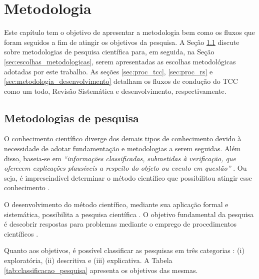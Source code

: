 \chapter[Metodologia]{Metodologia}\label{ch:metodologia}

Este capítulo tem o objetivo de apresentar a metodologia bem como os fluxos que foram seguidos a fim de atingir os objetivos da pesquisa. A Seção \ref{sec:metodologias} discute sobre metodologias de pesquisa científica para, em seguida, na Seção \ref{sec:escolhas_metodologicas}, serem apresentadas as escolhas metodológicas adotadas por este trabalho. As seções \ref{sec:proc_tcc}, \ref{sec:proc_rs} e \ref{sec:metodologia_desenvolvimento} detalham os fluxos de condução do TCC como um todo, Revisão Sistemática e desenvolvimento, respectivamente.

\section{Metodologias de pesquisa}\label{sec:metodologias}

O conhecimento científico diverge dos demais tipos de conhecimento devido à necessidade de adotar fundamentação e metodologias a serem seguidas. Além disso, baseia-se em \textit{“informações classificadas, submetidas à verificação, que oferecem explicações plausíveis a respeito do objeto ou evento em questão”} \cite[pág. 22]{prodanov2013}. Ou seja, é imprescindível determinar o método científico que possibilitou atingir esse conhecimento \cite[pág. 24]{prodanov2013}. 

O desenvolvimento do método científico, mediante sua aplicação formal e sistemática, possibilita a pesquisa científica \cite{gil2008}. O objetivo fundamental da pesquisa é descobrir respostas para problemas mediante o emprego de procedimentos científicos \cite[pág. 26]{gil2008}.

Quanto aos objetivos, é possível classificar as pesquisas em três categorias \cite[pág. 41]{gil2002}: (i) exploratória, (ii) descritiva e (iii) explicativa. A Tabela \ref{tab:classificacao_pesquisa} apresenta os objetivos das mesmas.




